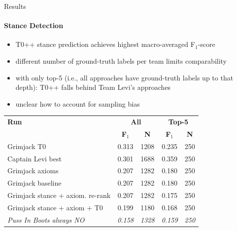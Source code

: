 \documentclass[english]{mlutalk}
\begin{document}
\begin{frame}{Results}
  \framesubtitle{Stance Detection}
  \begin{itemize}
    \item T0++ stance prediction achieves highest macro-averaged F$_1$-score
    \item different number of ground-truth labels per team limits comparability
    \item with only top-5 (i.e., all approaches have ground-truth labels up to that depth): T0++ falls behind Team Levi's approaches
    \item unclear how to account for sampling bias
  \end{itemize}
  \begin{table}[t]
    \centering
    \scriptsize
    \renewcommand{\tabcolsep}{5pt}
    \begin{tabular}{@{}lcccc@{}}
    \toprule
    \textbf{Run} & \multicolumn{2}{c}{\textbf{All}} & \multicolumn{2}{c}{\textbf{Top-5}} \\
    & \textbf{F$_1$} & \textbf{N} & \textbf{F$_1$} & \textbf{N} \\
    \midrule
    Grimjack T0 & 0.313 & 1208 & 0.235 & 250 \\
    Captain Levi best~\cite{RanaGJCEHP2022} & 0.301 & 1688 & 0.359 & 250 \\
    Grimjack axioms & 0.207 & 1282 & 0.180 & 250 \\
    Grimjack baseline & 0.207 & 1282 & 0.180 & 250 \\
    Grimjack stance + axiom. re-rank & 0.207 & 1282 & 0.175 & 250 \\
    Grimjack stance + axiom + T0 & 0.199 & 1180 & 0.168 & 250 \\
    \textit{Puss In Boots always NO}~\cite{BondarenkoFKSGBPBSWPH2022} & \textit{0.158} & \textit{1328} & \textit{0.159} & \textit{250} \\
    \bottomrule
    \end{tabular}
  \end{table}
\end{frame}
\end{document}
